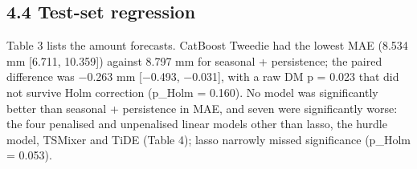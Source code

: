 \documentclass[
]{article}
\begin{document}
\begin{landscape}
\footnotesize\setlength{\tabcolsep}{2pt}

\normalsize
\end{landscape}

\begin{landscape}
\footnotesize\setlength{\tabcolsep}{2pt}

\normalsize
\end{landscape}

\hypertarget{test-set-regression}{%
\subsection{4.4 Test-set regression}\label{test-set-regression}}

Table 3 lists the amount forecasts. CatBoost Tweedie had the lowest MAE (8.534 mm {[}6.711, 10.359{]}) against 8.797 mm for seasonal + persistence; the paired difference was $-$0.263 mm {[}$-$0.493, $-$0.031{]}, with a raw DM p = 0.023 that did not survive Holm correction (p\_Holm = 0.160).  %
No model was significantly better than seasonal + persistence in MAE, and seven were significantly worse: the four penalised and unpenalised linear models other than lasso, the hurdle model, TSMixer and TiDE (Table 4); lasso narrowly missed significance (p\_Holm = 0.053).  %
\end{document}
